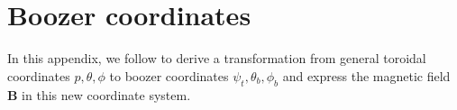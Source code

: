 \chapter{Boozer coordinates}
\label{appendix boozer coordinates}
In this appendix, we follow \citet{Helander2014} to derive a transformation from general toroidal coordinates $p,\theta,\phi$ to boozer coordinates $\psi_t,\theta_b,\phi_b$ and express the magnetic field $\mathbf{B}$ in this new coordinate system.